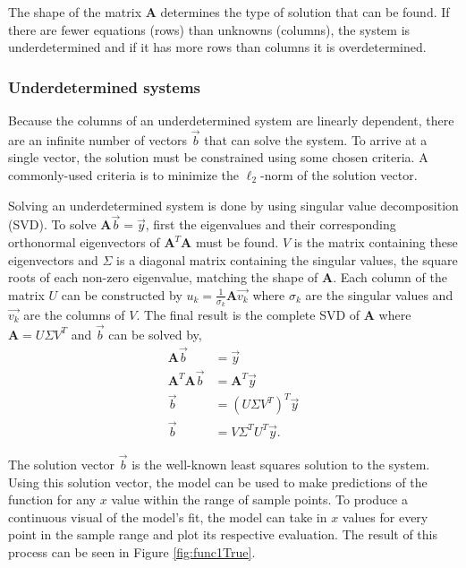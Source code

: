 The shape of the matrix $\mathbf{A}$ determines the type of solution that can be found.  If there are fewer equations (rows) than unknowns (columns), the system is underdetermined and if it has more rows than columns it is overdetermined.  


\subsubsection{Underdetermined systems}
Because the columns of an underdetermined system are linearly dependent, there are an infinite number of vectors $\vec{b}$ that can solve the system.  To arrive at a single vector, the solution must be constrained using some chosen criteria.  A commonly-used criteria is to minimize the $\ell_2$-norm of the solution vector. 

\par Solving an underdetermined system is done by using singular value decomposition (SVD)\cite{linAlg-book}. To solve $\mathbf{A}\vec{b}=\vec{y}$, first the eigenvalues and their corresponding orthonormal eigenvectors of $\mathbf{A}^T\mathbf{A}$ must be found. $V$ is the matrix containing these eigenvectors and $\Sigma$ is a diagonal matrix containing the singular values, the square roots of each non-zero eigenvalue, matching the shape of $\mathbf{A}$. Each column of the matrix $U$ can be constructed by $u_k=\frac{1}{\sigma_k}\mathbf{A}\vec{v_k}$ where $\sigma_k$ are the singular values and $\vec{v_k}$ are the columns of $V$. The final result is the complete SVD of $\mathbf{A}$ where $\mathbf{A}=U\Sigma V^T$ and $\vec{b}$ can be solved by,
\begin{align}
\mathbf{A}\vec{b} &= \vec{y} \nonumber \\
\mathbf{A}^T\mathbf{A}\vec{b} &= \mathbf{A}^T\vec{y} \nonumber \\
\vec{b} &= (U\Sigma V^T)^T\vec{y} \nonumber \\
\vec{b} &= V\Sigma^TU^T\vec{y}.
\end{align}

\par The solution vector $\vec{b}$ is the well-known least squares solution to the system. Using this solution vector, the model can be used to make predictions of the function for any $x$ value within the range of sample points. To produce a continuous visual of the model's fit, the model can take in $x$ values for every point in the sample range and plot its respective evaluation. The result of this process can be seen in Figure \ref{fig:func1True}.

